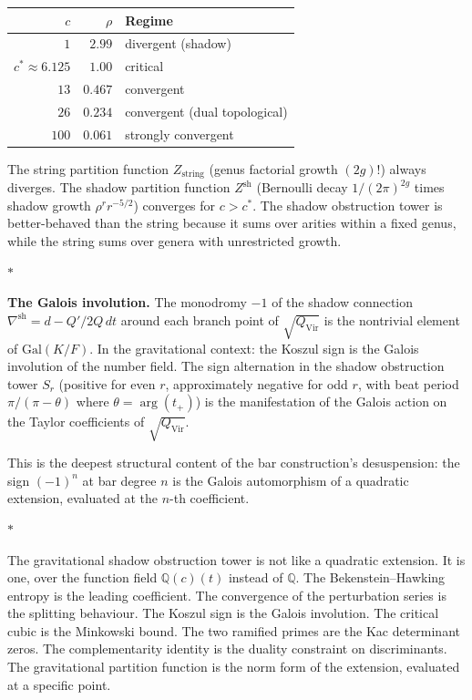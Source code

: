 \documentclass[11pt]{article}
\newcommand{\Q}{\mathbb{Q}}
\newcommand{\sep}{\bigskip\begin{center}$*$\end{center}\medskip}
\begin{document}
\begin{center}
\small
\renewcommand{\arraystretch}{1.15}
\begin{tabular}{@{}rrl@{}}
$c$ & $\rho$ & \textbf{Regime} \\
\hline
$1$ & $2.99$ & divergent (shadow) \\
$c^* \approx 6.125$ & $1.00$ & critical \\
$13$ & $0.467$ & convergent \\
$26$ & $0.234$ & convergent (dual topological) \\
$100$ & $0.061$ & strongly convergent
\end{tabular}
\end{center}

\medskip

The string partition function $Z_{\mathrm{string}}$ (genus
factorial growth $(2g)!$) always diverges.  The shadow partition
function $Z^{\mathrm{sh}}$ (Bernoulli decay $1/(2\pi)^{2g}$
times shadow growth $\rho^r r^{-5/2}$) converges for $c > c^*$.
The shadow obstruction tower is better-behaved than the string because it
sums over arities within a fixed genus, while the string sums
over genera with unrestricted growth.

\sep

\noindent\textbf{The Galois involution.}\enspace
The monodromy $-1$ of the shadow connection
$\nabla^{\mathrm{sh}} = d - Q'/2Q\,dt$ around each branch
point of $\sqrt{Q_{\mathrm{Vir}}}$ is the nontrivial element
of $\mathrm{Gal}(K/F)$.  In the gravitational context: the
Koszul sign is the Galois involution of the number field.  The
sign alternation in the shadow obstruction tower $S_r$ (positive for even
$r$, approximately negative for odd $r$, with beat period
$\pi/(\pi - \theta)$ where $\theta = \arg(t_+)$) is the
manifestation of the Galois action on the Taylor coefficients
of $\sqrt{Q_{\mathrm{Vir}}}$.

This is the deepest structural content of the bar
construction's desuspension: the sign $(-1)^n$ at bar degree
$n$ is the Galois automorphism of a quadratic extension,
evaluated at the $n$-th coefficient.

\sep

The gravitational shadow obstruction tower is not like a quadratic
extension.  It is one, over the function field $\Q(c)(t)$
instead of $\Q$.  The Bekenstein--Hawking entropy is the leading
coefficient.  The convergence of the perturbation series is the
splitting behaviour.  The Koszul sign is the Galois involution.
The critical cubic is the Minkowski bound.  The two ramified
primes are the Kac determinant zeros.  The complementarity
identity is the duality constraint on discriminants.  The
gravitational partition function is the norm form of the
extension, evaluated at a specific point.
\end{document}
